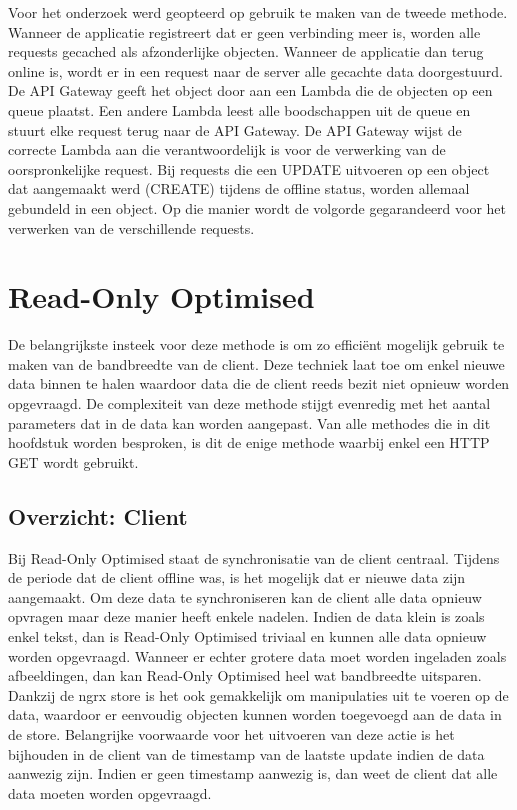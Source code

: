 Voor het onderzoek werd geopteerd op gebruik te maken van de tweede methode. Wanneer de applicatie registreert dat er geen verbinding meer is, worden alle requests gecached als afzonderlijke objecten. Wanneer de applicatie dan terug online is, wordt er in een request naar de server alle gecachte data doorgestuurd. De API Gateway geeft het object door aan een Lambda die de objecten op een queue plaatst.  Een andere Lambda leest alle boodschappen uit de queue en stuurt elke request terug naar de API Gateway. De API Gateway wijst de correcte Lambda aan die verantwoordelijk is voor de verwerking van de oorspronkelijke request. Bij requests die een UPDATE uitvoeren op een object dat aangemaakt werd (CREATE) tijdens de offline status, worden allemaal gebundeld in een object. Op die manier wordt de volgorde gegarandeerd voor het verwerken van de verschillende requests.

\section{Read-Only Optimised}
De belangrijkste insteek voor deze methode is om zo effici\"ent mogelijk gebruik te maken van de bandbreedte van de client. Deze techniek laat toe om enkel nieuwe data binnen te halen waardoor data die de client reeds bezit niet opnieuw worden opgevraagd. De complexiteit van deze methode stijgt evenredig met het aantal parameters dat in de data kan worden aangepast. Van alle methodes die in dit hoofdstuk worden besproken, is dit de enige methode waarbij enkel een HTTP GET wordt gebruikt.
\subsection{Overzicht: Client}
Bij Read-Only Optimised staat de synchronisatie van de client centraal. Tijdens de periode dat de client offline was, is het mogelijk dat er nieuwe data zijn aangemaakt. Om deze data te synchroniseren kan de client alle data opnieuw opvragen maar deze manier heeft enkele nadelen. Indien de data klein is zoals enkel tekst, dan is Read-Only Optimised triviaal en kunnen alle data opnieuw worden opgevraagd. Wanneer er echter grotere data moet worden ingeladen zoals afbeeldingen, dan kan Read-Only Optimised heel wat bandbreedte uitsparen. Dankzij de ngrx store is het ook gemakkelijk om manipulaties uit te voeren op de data, waardoor er eenvoudig objecten kunnen worden toegevoegd aan de data in de store. Belangrijke voorwaarde voor het uitvoeren van deze actie is het bijhouden in de client van de timestamp van de laatste update indien de data aanwezig zijn. Indien er geen timestamp aanwezig is, dan weet de client dat alle data moeten worden opgevraagd.

